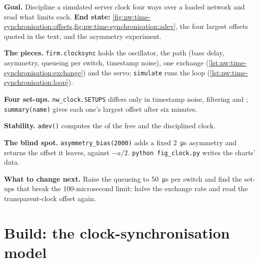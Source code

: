 \begin{tutorial}
\textbf{Goal.} Discipline a simulated server clock four ways over a loaded network and read what limits each.
\textbf{End state:} \cref{fig:nw:time-synchronisation:offsets,fig:nw:time-synchronisation:adev}, the four largest offsets quoted in the
text, and the asymmetry experiment.
\begin{tutsteps}
\item \textbf{The pieces.} \texttt{firm.clocksync} holds the oscillator, the path (base delay, asymmetry, queueing per switch, timestamp
  noise), one exchange (\cref{lst:nw:time-synchronisation:exchange}) and the servo; \texttt{simulate} runs the loop
  (\cref{lst:nw:time-synchronisation:loop}).
\item \textbf{Four set-ups.} \texttt{nw\_clock.SETUPS} differs only in timestamp noise, filtering and ;
  \texttt{summary(name)} gives each one's largest offset after six minutes.
\item \textbf{Stability.} \texttt{adev()} computes the  of the free and the disciplined clock.
\item \textbf{The blind spot.} \texttt{asymmetry\_bias(2000)} adds a fixed \qty{2}{\micro\second} asymmetry and returns the offset it
  leaves, against $-a/2$. \texttt{python fig\_clock.py} writes the charts' data.
\end{tutsteps}
\textbf{What to change next.} Raise the queueing to \qty{50}{\micro\second} per switch and find the set-ups that break the
100-microsecond limit; halve the exchange rate and read the transparent-clock offset again.
\end{tutorial}

\section{Build: the clock-synchronisation model}\label{bld:nw:time-synchronisation:clocksync}

